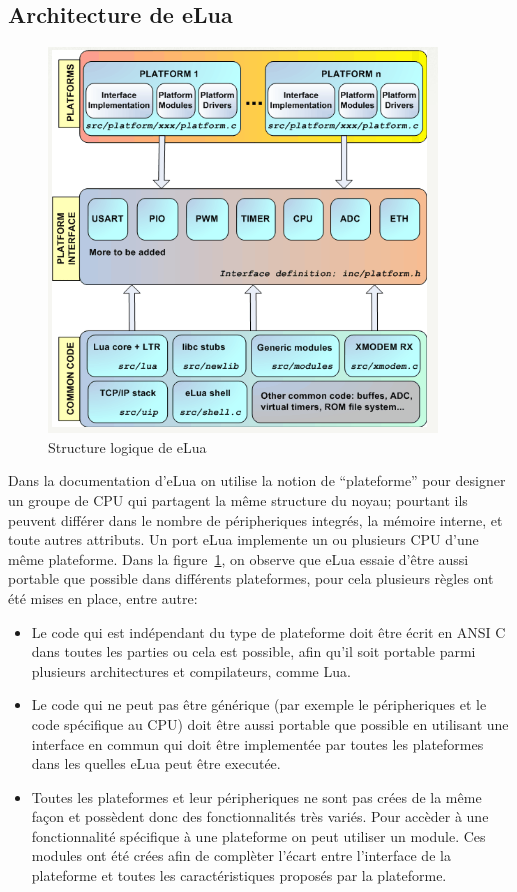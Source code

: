 \subsection{Architecture de eLua}

\begin{figure}[h]
\begin{center}
\includegraphics[scale=0.6]{../images/eLua/schema.png}
\caption{Structure logique de eLua}
\label{elua}
\end{center}
\end{figure}

  Dans la documentation d'eLua on utilise la notion de ``plateforme'' pour designer un groupe de CPU qui partagent la même structure du noyau; pourtant
ils peuvent différer dans le nombre de péripheriques integrés, la mémoire interne, et toute autres attributs. Un port eLua implemente un ou plusieurs
CPU d'une même plateforme.
Dans la figure~\ref{elua}, on observe que eLua essaie d'être aussi portable que possible dans différents plateformes, pour cela plusieurs règles ont été mises en
place, entre autre:

\begin{itemize}
 \item Le code qui est indépendant du type de plateforme doit être écrit en ANSI C dans toutes les parties ou cela est possible, afin qu'il soit
portable parmi plusieurs architectures et compilateurs, comme Lua.

 \item Le code qui ne peut pas être générique (par exemple le péripheriques et le code spécifique au CPU) doit être aussi portable que possible en
utilisant une interface en commun qui doit être implementée par toutes les plateformes dans les quelles eLua peut être executée.

 \item Toutes les plateformes et leur péripheriques ne sont pas crées de la même façon et possèdent donc des fonctionnalités très variés. Pour accèder
à une fonctionnalité spécifique à une plateforme on peut utiliser un module. Ces modules ont été crées afin de complèter l'écart entre l'interface de
la plateforme et toutes les caractéristiques proposés par la plateforme.

\end{itemize}

